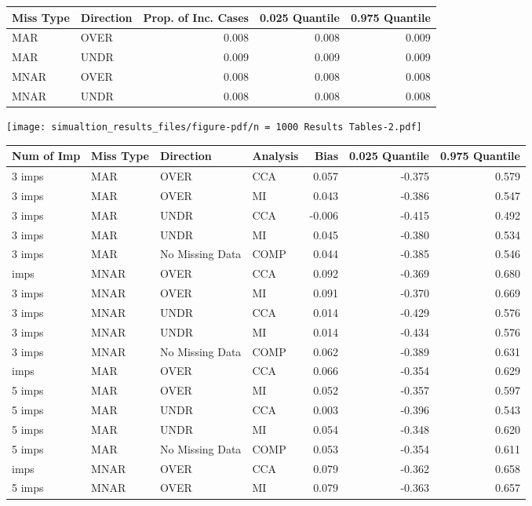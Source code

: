 \documentclass[
  letterpaper,
  DIV=11,
  numbers=noendperiod]{scrartcl}
\begin{document}
\begin{tabular}[t]{llrrr}
\toprule
Miss Type & Direction & Prop. of Inc. Cases & 0.025 Quantile & 0.975 Quantile\\
\midrule
MAR & OVER & 0.008 & 0.008 & 0.009\\
MAR & UNDR & 0.009 & 0.009 & 0.009\\
MNAR & OVER & 0.008 & 0.008 & 0.008\\
MNAR & UNDR & 0.008 & 0.008 & 0.008\\
\bottomrule
\end{tabular}

\texttt{[image: simualtion\_results\_files/figure-pdf/n = 1000 Results Tables-2.pdf]}

\begin{tabular}[t]{llllrrr}
\toprule
Num of Imp & Miss Type & Direction & Analysis & Bias & 0.025 Quantile & 0.975 Quantile\\
\midrule
3 imps & MAR & OVER & CCA & 0.057 & -0.375 & 0.579\\
3 imps & MAR & OVER & MI & 0.043 & -0.386 & 0.547\\
3 imps & MAR & UNDR & CCA & -0.006 & -0.415 & 0.492\\
3 imps & MAR & UNDR & MI & 0.045 & -0.380 & 0.534\\
3 imps & MAR & No Missing Data & COMP & 0.044 & -0.385 & 0.546\\
\addlinespace
3 imps & MNAR & OVER & CCA & 0.092 & -0.369 & 0.680\\
3 imps & MNAR & OVER & MI & 0.091 & -0.370 & 0.669\\
3 imps & MNAR & UNDR & CCA & 0.014 & -0.429 & 0.576\\
3 imps & MNAR & UNDR & MI & 0.014 & -0.434 & 0.576\\
3 imps & MNAR & No Missing Data & COMP & 0.062 & -0.389 & 0.631\\
\addlinespace
5 imps & MAR & OVER & CCA & 0.066 & -0.354 & 0.629\\
5 imps & MAR & OVER & MI & 0.052 & -0.357 & 0.597\\
5 imps & MAR & UNDR & CCA & 0.003 & -0.396 & 0.543\\
5 imps & MAR & UNDR & MI & 0.054 & -0.348 & 0.620\\
5 imps & MAR & No Missing Data & COMP & 0.053 & -0.354 & 0.611\\
\addlinespace
5 imps & MNAR & OVER & CCA & 0.079 & -0.362 & 0.658\\
5 imps & MNAR & OVER & MI & 0.079 & -0.363 & 0.657\\

\end{tabular}
\end{document}
